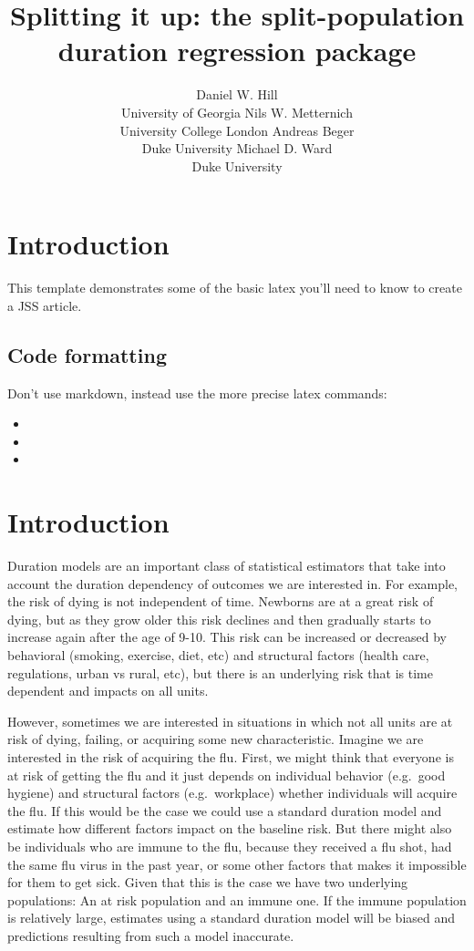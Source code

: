\documentclass[article]{jss}
\author{
Daniel W. Hill\\University of Georgia \And Nils W. Metternich\\University College London \And Andreas Beger\\Duke University \And Michael D. Ward\\Duke University
}
\title{Splitting it up: the \pkg{spduration} split-population duration
regression package}
\begin{document}
\section{Introduction}\label{introduction}

This template demonstrates some of the basic latex you'll need to know
to create a JSS article.

\subsection{Code formatting}\label{code-formatting}

Don't use markdown, instead use the more precise latex commands:

\begin{itemize}
\itemsep1pt\parskip0pt
\item
\item
\item
\end{itemize}

\section{Introduction}\label{introduction-1}

Duration models are an important class of statistical estimators that
take into account the duration dependency of outcomes we are interested
in. For example, the risk of dying is not independent of time. Newborns
are at a great risk of dying, but as they grow older this risk declines
and then gradually starts to increase again after the age of 9-10. This
risk can be increased or decreased by behavioral (smoking, exercise,
diet, etc) and structural factors (health care, regulations, urban vs
rural, etc), but there is an underlying risk that is time dependent and
impacts on all units.

However, sometimes we are interested in situations in which not all
units are at risk of dying, failing, or acquiring some new
characteristic. Imagine we are interested in the risk of acquiring the
flu. First, we might think that everyone is at risk of getting the flu
and it just depends on individual behavior (e.g.~good hygiene) and
structural factors (e.g.~workplace) whether individuals will acquire the
flu. If this would be the case we could use a standard duration model
and estimate how different factors impact on the baseline risk. But
there might also be individuals who are immune to the flu, because they
received a flu shot, had the same flu virus in the past year, or some
other factors that makes it impossible for them to get sick. Given that
this is the case we have two underlying populations: An at risk
population and an immune one. If the immune population is relatively
large, estimates using a standard duration model will be biased and
predictions resulting from such a model inaccurate.
\end{document}
